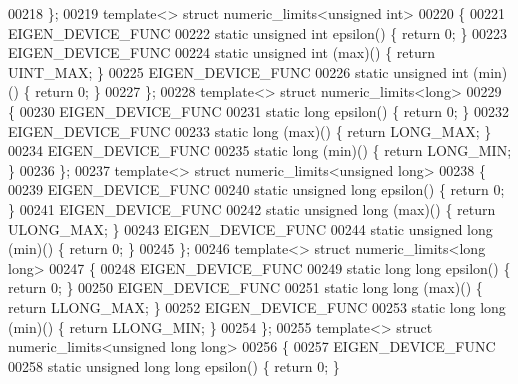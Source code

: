 \begin{DoxyCode}
00218 \};
00219 \textcolor{keyword}{template}<> \textcolor{keyword}{struct }numeric\_limits<unsigned int>
00220 \{
00221   EIGEN\_DEVICE\_FUNC
00222   \textcolor{keyword}{static} \textcolor{keywordtype}{unsigned} \textcolor{keywordtype}{int} epsilon() \{ \textcolor{keywordflow}{return} 0; \}
00223   EIGEN\_DEVICE\_FUNC
00224   \textcolor{keyword}{static} \textcolor{keywordtype}{unsigned} int (max)() \{ \textcolor{keywordflow}{return} UINT\_MAX; \}
00225   EIGEN\_DEVICE\_FUNC
00226   \textcolor{keyword}{static} \textcolor{keywordtype}{unsigned} int (min)() \{ \textcolor{keywordflow}{return} 0; \}
00227 \};
00228 \textcolor{keyword}{template}<> \textcolor{keyword}{struct }numeric\_limits<long>
00229 \{
00230   EIGEN\_DEVICE\_FUNC
00231   \textcolor{keyword}{static} \textcolor{keywordtype}{long} epsilon() \{ \textcolor{keywordflow}{return} 0; \}
00232   EIGEN\_DEVICE\_FUNC
00233   \textcolor{keyword}{static} long (max)() \{ \textcolor{keywordflow}{return} LONG\_MAX; \}
00234   EIGEN\_DEVICE\_FUNC
00235   \textcolor{keyword}{static} long (min)() \{ \textcolor{keywordflow}{return} LONG\_MIN; \}
00236 \};
00237 \textcolor{keyword}{template}<> \textcolor{keyword}{struct }numeric\_limits<unsigned long>
00238 \{
00239   EIGEN\_DEVICE\_FUNC
00240   \textcolor{keyword}{static} \textcolor{keywordtype}{unsigned} \textcolor{keywordtype}{long} epsilon() \{ \textcolor{keywordflow}{return} 0; \}
00241   EIGEN\_DEVICE\_FUNC
00242   \textcolor{keyword}{static} \textcolor{keywordtype}{unsigned} long (max)() \{ \textcolor{keywordflow}{return} ULONG\_MAX; \}
00243   EIGEN\_DEVICE\_FUNC
00244   \textcolor{keyword}{static} \textcolor{keywordtype}{unsigned} long (min)() \{ \textcolor{keywordflow}{return} 0; \}
00245 \};
00246 \textcolor{keyword}{template}<> \textcolor{keyword}{struct }numeric\_limits<long long>
00247 \{
00248   EIGEN\_DEVICE\_FUNC
00249   \textcolor{keyword}{static} \textcolor{keywordtype}{long} \textcolor{keywordtype}{long} epsilon() \{ \textcolor{keywordflow}{return} 0; \}
00250   EIGEN\_DEVICE\_FUNC
00251   \textcolor{keyword}{static} \textcolor{keywordtype}{long} long (max)() \{ \textcolor{keywordflow}{return} LLONG\_MAX; \}
00252   EIGEN\_DEVICE\_FUNC
00253   \textcolor{keyword}{static} \textcolor{keywordtype}{long} long (min)() \{ \textcolor{keywordflow}{return} LLONG\_MIN; \}
00254 \};
00255 \textcolor{keyword}{template}<> \textcolor{keyword}{struct }numeric\_limits<unsigned long long>
00256 \{
00257   EIGEN\_DEVICE\_FUNC
00258   \textcolor{keyword}{static} \textcolor{keywordtype}{unsigned} \textcolor{keywordtype}{long} \textcolor{keywordtype}{long} epsilon() \{ \textcolor{keywordflow}{return} 0; \}

\end{DoxyCode}
